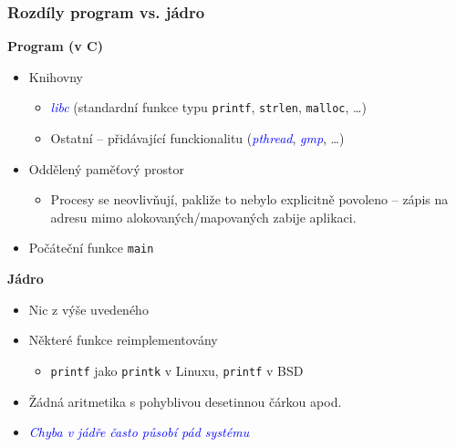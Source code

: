 \documentclass[xcolor=dvipsnames]{beamer}
\let\Oldemph\emph
\renewcommand{\emph}[1]{\textcolor{blue}{\Oldemph{#1}}}
\newcommand{\heading}[1]{\textbf{\textcolor{BurntOrange}{#1}}}
\begin{document}
\begin{frame}
  \frametitle{Rozdíly program vs. jádro}
  \heading{Program (v C)}
  \begin{itemize}
  \item Knihovny
  \begin{itemize}
  \item \emph{libc} (standardní funkce typu \texttt{printf}, \texttt{strlen},
    \texttt{malloc}, \ldots)
  \item Ostatní -- přidávající funckionalitu (\emph{pthread}, \emph{gmp},
    \ldots)
  \end{itemize}
  \item Oddělený paměťový prostor
  \begin{itemize}
  \item Procesy se neovlivňují, pakliže to nebylo explicitně povoleno -- zápis
    na adresu mimo alokovaných/mapovaných zabije aplikaci.
  \end{itemize}
  \item Počáteční funkce \texttt{main}
  \end{itemize}

  \pause
  \medskip

  \heading{Jádro}
  \begin{itemize}
  \item Nic z výše uvedeného
  \item Některé funkce reimplementovány
  \begin{itemize}
  \item \texttt{printf} jako \texttt{printk} v Linuxu, \texttt{printf} v
    BSD
  \end{itemize}
  \item Žádná aritmetika s pohyblivou desetinnou čárkou apod.
  \item \emph{Chyba v jádře často působí pád systému}
  \end{itemize}
\end{frame}
\end{document}
